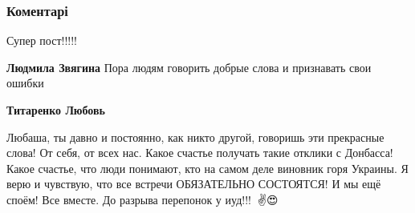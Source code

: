  
 
 
 
 
\subsubsection{Коментарі}

\begin{itemize}
 
Супер пост!!!!!

\begin{itemize}
 
\textbf{Людмила Звягина} Пора людям говорить добрые слова и признавать свои ошибки

 
\textbf{Титаренко Любовь} 

Любаша, ты давно и постоянно, как никто другой, говоришь эти прекрасные слова!
От себя, от всех нас. Какое счастье получать такие отклики с Донбасса! Какое
счастье, что люди понимают, кто на самом деле виновник горя Украины. Я верю и
чувствую, что все встречи ОБЯЗАТЕЛЬНО СОСТОЯТСЯ! И мы ещё споём! Все вместе. До
разрыва перепонок у иуд!!!👊✊✌️😍


 

\end{itemize}
\end{itemize}
